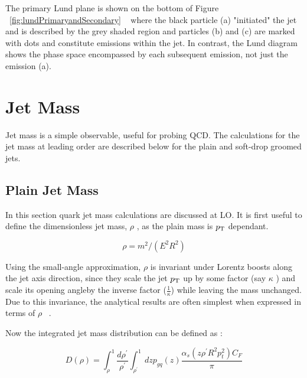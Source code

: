 The primary Lund plane is shown on the bottom of Figure ~\ref{fig:lundPrimaryandSecondary} ~\cite{Dreyer:2018nbf} where the black particle (a) "initiated" the jet and is described by the grey shaded region and particles (b) and (c) are marked with dots and constitute emissions within the jet. In contrast, the Lund diagram shows the phase space encompassed by each subsequent emission, not just the emission (a).~\cite{Dreyer:2018nbf}






\section{Jet Mass}\label{sec:jetmass}


Jet mass is a simple observable, useful for probing QCD. The calculations for the jet mass at leading order are described below for the plain and soft-drop groomed jets.

\subsection{Plain Jet Mass }\label{sec:jetmass}


In this section quark jet mass calculations are discussed at LO. It is first useful to define the dimensionless jet mass, $\rho$ , as the plain mass is $p_{\mathrm{T}}$ dependant.


\begin{equation}
\rho=m^{2} /\left(E^{2} R^{2}\right)
\end{equation}



Using the small-angle approximation, $\rho$ is invariant under Lorentz boosts along the jet axis direction, since they scale the jet $p_{\mathrm{T}}$ up by some factor (say $\kappa$ ) and scale its opening angleby the inverse factor ($\frac{1}{\kappa}$) while leaving the mass unchanged. Due to this invariance, the analytical results are often simplest when expressed in terms of $\rho$ ~\cite{mmdt}.

Now the integrated jet mass distribution can be defined as :\newline

\begin{equation}
D(\rho)=\int_{\rho}^{1} \frac{d \rho^{\prime}}{\rho^{\prime}} \int_{\rho^{\prime}}^{1} d z p_{g q}(z) \frac{\alpha_{s}\left(z \rho^{\prime} R^{2} p_{t}^{2}\right) C_{F}}{\pi}
\end{equation}


